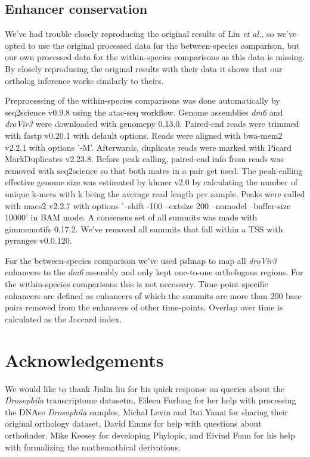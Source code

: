 \subsection{Enhancer conservation}

We've had trouble closely reproducing the original results of Liu \textit{et al.}, so we've opted to use the original processed data for the between-species comparison, but our own processed data for the within-species comparisons as this data is missing. By closely reproducing the original results with their data it shows that our ortholog inference works similarly to theirs.

Preprocessing of the within-species comparisons was done automatically by seq2science v0.9.8\cite{seq2science} using the atac-seq workflow\cite{Choudhary2019}. Genome assemblies \textit{dm6} and \textit{droVir3} were downloaded with genomepy 0.13.0\cite{Frlich2023}. Paired-end reads were trimmed with fastp v0.20.1\cite{Chen2018} with default options. Reads were aligned with bwa-mem2 v2.2.1\cite{bwamem2} with options '-M'. Afterwards, duplicate reads were marked with Picard MarkDuplicates v2.23.8\cite{picard}. Before peak calling, paired-end info from reads was removed with seq2science so that both mates in a pair get used. The peak-calling effective genome size was estimated by khmer v2.0\cite{Crusoe2015} by calculating the number of unique k-mers with k being the average read length per sample. Peaks were called with macs2 v2.2.7\cite{Zhang2008} with options '--shift -100 --extsize 200 --nomodel --buffer-size 10000' in BAM mode. A consensus set of all summits was made with gimmemotifs 0.17.2\cite{gimmemotifs}. We've removed all summits that fall within a TSS with pyranges v0.0.120\cite{Stovner2019}.

For the between-species comparison we've used pslmap to map all \textit{droVir3} enhancers to the \textit{dm6} assembly and only kept one-to-one orthologous regions. For the within-species comparisons this is not necessary. Time-point specific enhancers are defined as enhancers of which the summits are more than 200 base pairs removed from the enhancers of other time-points. Overlap over time is calculated as the Jaccard index.

\section{Acknowledgements}

We would like to thank Jialin liu for his quick response on queries about the \textit{Drosophila} transcriptome datasetm, Eileen Furlong for her help with processing the DNAse \textit{Drosophila} samples, Michal Levin and Itai Yanai for sharing their original orthology dataset, David Emms for help with questions about orthofinder. Mike Keesey for developing Phylopic, and Eivind Fonn for his help with formalizing the mathemathical derivations.

